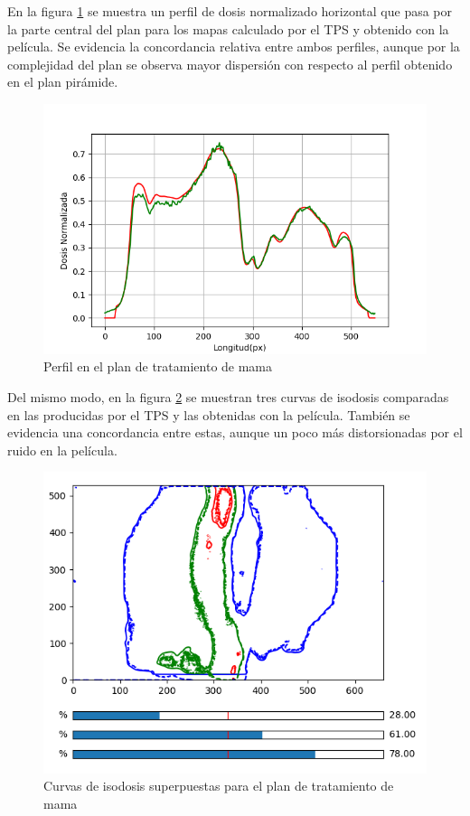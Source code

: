 En la figura \ref{fig:mamaPerfil} se muestra un perfil de dosis normalizado horizontal que pasa por la parte central del plan para los mapas calculado por el TPS y obtenido con la película. Se evidencia la concordancia relativa entre ambos perfiles, aunque por la complejidad del plan se observa mayor dispersión con respecto al perfil obtenido en el plan pirámide.\\

\begin{figure}[H]
	\centering
	\includegraphics[width=0.7\linewidth]{images/perfilDosisMama.png}
	\caption{Perfil en el plan de tratamiento de mama }
	\label{fig:mamaPerfil}
\end{figure}

Del mismo modo, en la figura \ref{fig:mamaIsodosis} se muestran tres curvas de isodosis comparadas en las producidas por el TPS y las obtenidas con la película. También se evidencia una concordancia entre estas, aunque un poco más distorsionadas por el ruido en la película.

\begin{figure}[H]
	\centering
	\includegraphics[width=0.7\linewidth]{images/curvasIsodosisMama.png}
	\caption{Curvas de isodosis superpuestas para el plan de tratamiento de mama }
	\label{fig:mamaIsodosis}
\end{figure}

